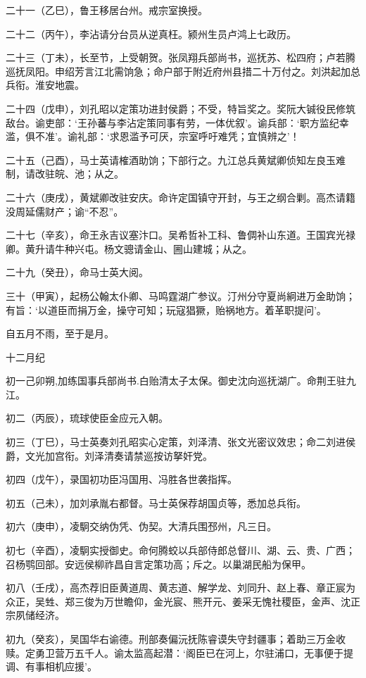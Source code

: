 \documentclass[]{article}
\begin{document}
二十一（乙巳），鲁王移居台州。戒宗室换授。

二十二（丙午），李沾请分台员从逆真枉。颍州生员卢鸿上七政历。

二十三（丁未），长至节，上受朝贺。张凤翔兵部尚书，巡抚苏、松四府；卢若腾巡抚凤阳。申绍芳言江北需饷急；命户部于附近府州县措二十万付之。刘洪起加总兵衔。淮安地震。

二十四（戊申），刘孔昭以定策功进封侯爵；不受，特旨奖之。奖阮大铖役民修筑敌台。谕吏部：`王孙蕃与李沾定策同事有劳，一体优叙'。谕兵部：`职方监纪幸滥，俱不准'。谕礼部：`求恩滥予可厌，宗室呼吁难凭；宜慎辨之'！

二十五（己酉），马士英请榷酒助饷；下部行之。九江总兵黄斌卿侦知左良玉难制，请改驻皖、池；从之。

二十六（庚戌），黄斌卿改驻安庆。命许定国镇守开封，与王之纲合剿。高杰请籍没周延儒财产；谕``不忍''。

二十七（辛亥），命王永吉议塞汴口。吴希哲补工科、鲁倜补山东道。王国宾光禄卿。黄升请牛种兴屯。杨文骢请金山、圌山建城；从之。

二十九（癸丑），命马士英大阅。

三十（甲寅），起杨公翰太仆卿、马鸣霆湖广参议。汀州分守夏尚絅进万金助饷；有旨：`以道臣而捐万金，操守可知；玩寇猖獗，贻祸地方。着革职提问'。

自五月不雨，至于是月。

十二月纪

初一己卯朔,加练国事兵部尚书.白贻清太子太保。御史沈向巡抚湖广。命荆王驻九江。

初二（丙辰），琉球使臣金应元入朝。

初三（丁巳），马士英奏刘孔昭实心定策，刘泽清、张文光密议效忠；命二刘进侯爵，文光加宫衔。刘泽清奏请禁巡按访拏奸党。

初四（戊午），录国初功臣冯国用、冯胜各世袭指挥。

初五（己未），加刘承胤右都督。马士英保荐胡国贞等，悉加总兵衔。

初六（庚申），凌駉交纳伪凭、伪契。大清兵围邳州，凡三日。

初七（辛酉），凌駉实授御史。命何腾蛟以兵部侍郎总督川、湖、云、贵、广西；召杨鹗回部。安远侯柳祚昌自言定策功高；斥之。以巢湖民船为保甲。

初八（壬戌），高杰荐旧臣黄道周、黄志道、解学龙、刘同升、赵上春、章正宸为众正，吴甡、郑三俊为万世瞻仰，金光宸、熊开元、姜采无愧社稷臣，金声、沈正宗夙储经济。

初九（癸亥），吴国华右谕德。刑部奏偏沅抚陈睿谟失守封疆事；着助三万金收赎。定勇卫营万五千人。谕太监高起潜：`阁臣已在河上，尔驻浦口，无事便于提调、有事相机应援'。
\end{document}

